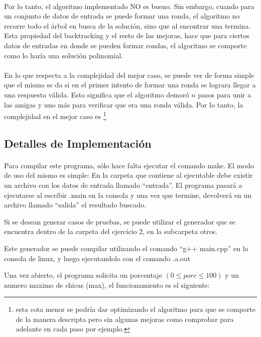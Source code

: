 \paragraph{}
Por lo tanto, el algoritmo implementado NO es bueno. Sin embargo, cuando para un conjunto de datos de entrada se puede formar una ronda, el algoritmo no recorre todo el árbol en busca de la solución, sino que al encontrar una termina. Esta propiedad del backtracking y el resto de las mejoras, hace que para ciertos datos de entradas en donde se pueden formar rondas, el algoritmo se comporte como lo haría una solución polinomial.

\paragraph{}
En lo que respecta a la complejidad del mejor caso, se puede ver de forma simple que el mismo se da si en el primer intento de formar una ronda se lograra llegar a una respuesta válida. Esto significa que el algoritmo demoró $n$ pasos para unir a las amigas y uno más para verificar que era una ronda válida. Por lo tanto, la complejidad en el mejor caso es  \footnote{esta cota menor se podría dar optimizando el algoritmo para que se comporte de la manera descripta pero sin algunas mejoras como comprobar para adelante en cada paso por ejemplo.}


\subsection{Detalles de Implementación}
\paragraph{}
Para compilar este programa, sólo hace falta ejecutar el comando make. El modo de uso del mismo es simple: En la carpeta que contiene al ejecutable debe existir un archivo con los datos de entrada llamado ``entrada''. El programa pasará a ejecutarse al escribir .\/main en la consola y una vez que termine, devolverá en un archivo llamado ``salida'' el resultado buscado.

Si se desean generar casos de pruebas, se puede utilizar el generador que se encuentra dentro de la carpeta del ejercicio 2, en la subcarpeta otros.

Este generador se puede compilar utilizando el comando ``g++ main.cpp'' en la consola de linux, y luego ejecutandolo con el comando .\/a.out

Una vez abierto, el programa solicita un porcentaje $(0 \leq porc \leq 100)$ y un numero maximo de chicas (max), el funcionamiento es el siguiente:

